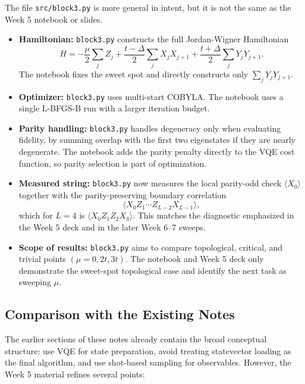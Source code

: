 \documentclass[11pt]{article}
\begin{document}
The file \texttt{src/block3.py} is more general in intent, but it is not the
same as the Week 5 notebook or slides.

\begin{itemize}
  \item \textbf{Hamiltonian:} \texttt{block3.py} constructs the full
  Jordan-Wigner Hamiltonian
  \[
    H=-\frac{\mu}{2}\sum_j Z_j
      +\frac{t-\Delta}{2}\sum_j X_jX_{j+1}
      +\frac{t+\Delta}{2}\sum_j Y_jY_{j+1}.
  \]
  The notebook fixes the sweet spot and directly constructs only
  $\sum_jY_jY_{j+1}$.

  \item \textbf{Optimizer:} \texttt{block3.py} uses multi-start COBYLA. The
  notebook uses a single L-BFGS-B run with a larger iteration budget.

  \item \textbf{Parity handling:} \texttt{block3.py} handles degeneracy only
  when evaluating fidelity, by summing overlap with the first two eigenstates
  if they are nearly degenerate. The notebook adds the parity penalty directly
  to the VQE cost function, so parity selection is part of optimization.

  \item \textbf{Measured string:} \texttt{block3.py} now measures the local
  parity-odd check $\langle X_0\rangle$ together with the parity-preserving
  boundary correlation
  \[
    \langle X_0Z_1\cdots Z_{L-2}X_{L-1}\rangle,
  \]
  which for $L=4$ is $\langle X_0Z_1Z_2X_3\rangle$. This matches the
  diagnostic emphasized in the Week 5 deck and in the later Week 6--7 sweeps.

  \item \textbf{Scope of results:} \texttt{block3.py} aims to compare
  topological, critical, and trivial points $(\mu=0,2t,3t)$. The notebook and
  Week 5 deck only demonstrate the sweet-spot topological case and identify the
  next task as sweeping $\mu$.
\end{itemize}

\subsection{Comparison with the Existing Notes}

The earlier sections of these notes already contain the broad conceptual
structure: use VQE for state preparation, avoid treating statevector loading as
the final algorithm, and use shot-based sampling for observables. However, the
Week 5 material refines several points:
\end{document}
